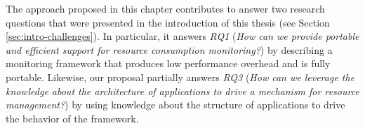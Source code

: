 The approach proposed in this chapter contributes to answer two research questions that were presented in the introduction of this thesis (see Section \ref{sec:intro-challenges}).
In particular, it answers \textit{RQ1} (\textit{How can we provide portable and efficient support for resource consumption monitoring?}) by describing a monitoring framework that produces low performance overhead and is fully portable.
Likewise, our proposal partially answers \textit{RQ3} (\textit{How can we leverage the knowledge about the architecture of applications to drive
a mechanism for resource management?}) by using knowledge about the structure of applications to drive the behavior of the framework.


